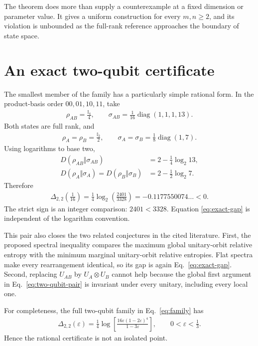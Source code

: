 \documentclass[
  aps,
  pra,
  reprint,
  superscriptaddress,
  nofootinbib,
  longbibliography
]{revtex4-2}
\theoremstyle{remark}
\newcommand{\identity}{\mathbb{I}}
\newcommand{\diag}{\operatorname{diag}}
\begin{document}
The theorem does more than supply a counterexample at a fixed dimension or
parameter value.  It gives a uniform construction for every $m,n\geq2$, and
its violation is unbounded as the full-rank reference approaches the boundary
of state space.

\section{An exact two-qubit certificate}

The smallest member of the family has a particularly simple rational form.
In the product-basis order $00,01,10,11$, take
\begin{align}
 \rho_{AB}=\frac{\identity_4}{4},
 \qquad
 \sigma_{AB}=\frac{1}{16}\diag(1,1,1,13).
 \label{eq:two-qubit-pair}
\end{align}
Both states are full rank, and
\begin{align}
 \rho_A=\rho_B=\frac{\identity_2}{2},
 \qquad
 \sigma_A=\sigma_B=\frac18\diag(1,7).
 \label{eq:two-qubit-marginals}
\end{align}
Using logarithms to base two,
\begin{align}
 D(\rho_{AB}\Vert\sigma_{AB})
 &=2-\frac14\log_2 13,
 \nonumber\\
 D(\rho_A\Vert\sigma_A)
 =D(\rho_B\Vert\sigma_B)
 &=2-\frac12\log_2 7.
 \label{eq:exact-entropies}
\end{align}
Therefore
\begin{align}
 \Delta_{2,2}\!\left(\frac1{16}\right)
 =\frac14\log_2\!\left(\frac{2401}{3328}\right)
 =-0.1177550074\ldots<0.
 \label{eq:exact-gap}
\end{align}
The strict sign is an integer comparison: $2401<3328$.  Equation
\eqref{eq:exact-gap} is independent of the logarithm convention.

This pair also closes the two related conjectures in the cited literature.
First, the proposed spectral inequality compares the maximum global
unitary-orbit relative entropy with the minimum marginal unitary-orbit
relative entropies.  Flat spectra make every rearrangement identical, so its
gap is again Eq.~\eqref{eq:exact-gap}.  Second, replacing $U_{AB}$ by
$U_A\otimes U_B$ cannot help because the global first argument in
Eq.~\eqref{eq:two-qubit-pair} is invariant under every unitary, including
every local one.

For completeness, the full two-qubit family in
Eq.~\eqref{eq:family} has
\begin{align}
 \Delta_{2,2}(\varepsilon)
 =\frac14\log\!\left[
 \frac{16\varepsilon(1-2\varepsilon)^4}{1-3\varepsilon}
 \right],
 \qquad 0<\varepsilon<\frac13.
 \label{eq:two-qubit-family}
\end{align}
Hence the rational certificate is not an isolated point.
\end{document}
